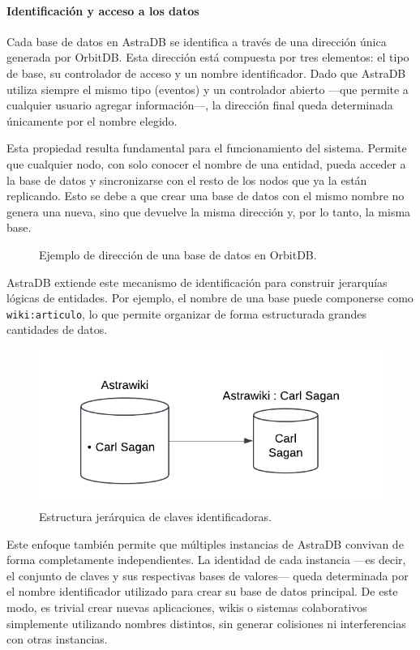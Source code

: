 \paragraph{Identificación y acceso a los datos}

Cada base de datos en AstraDB se identifica a través de una dirección única generada por OrbitDB. Esta dirección está compuesta por tres elementos: el tipo de base, su controlador de acceso y un nombre identificador. Dado que AstraDB utiliza siempre el mismo tipo (eventos) y un controlador abierto —que permite a cualquier usuario agregar información—, la dirección final queda determinada únicamente por el nombre elegido.

Esta propiedad resulta fundamental para el funcionamiento del sistema. Permite que cualquier nodo, con solo conocer el nombre de una entidad, pueda acceder a la base de datos y sincronizarse con el resto de los nodos que ya la están replicando. Esto se debe a que crear una base de datos con el mismo nombre no genera una nueva, sino que devuelve la misma dirección y, por lo tanto, la misma base.



\begin{figure}[H]
\centering
{}
\caption{Ejemplo de dirección de una base de datos en OrbitDB.}
\end{figure}

AstraDB extiende este mecanismo de identificación para construir jerarquías lógicas de entidades. Por ejemplo, el nombre de una base puede componerse como \texttt{wiki:articulo}, lo que permite organizar de forma estructurada grandes cantidades de datos.

\begin{figure}[H]
\centering
\includegraphics[width=0.6\linewidth]{img/solucion-ipfs/bdd-names.png}
\caption{Estructura jerárquica de claves identificadoras.}
\label{fig:bdd-names}
\end{figure}

Este enfoque también permite que múltiples instancias de AstraDB convivan de forma completamente independientes. La identidad de cada instancia —es decir, el conjunto de claves y sus respectivas bases de valores— queda determinada por el nombre identificador utilizado para crear su base de datos principal. De este modo, es trivial crear nuevas aplicaciones, wikis o sistemas colaborativos simplemente utilizando nombres distintos, sin generar colisiones ni interferencias con otras instancias.

